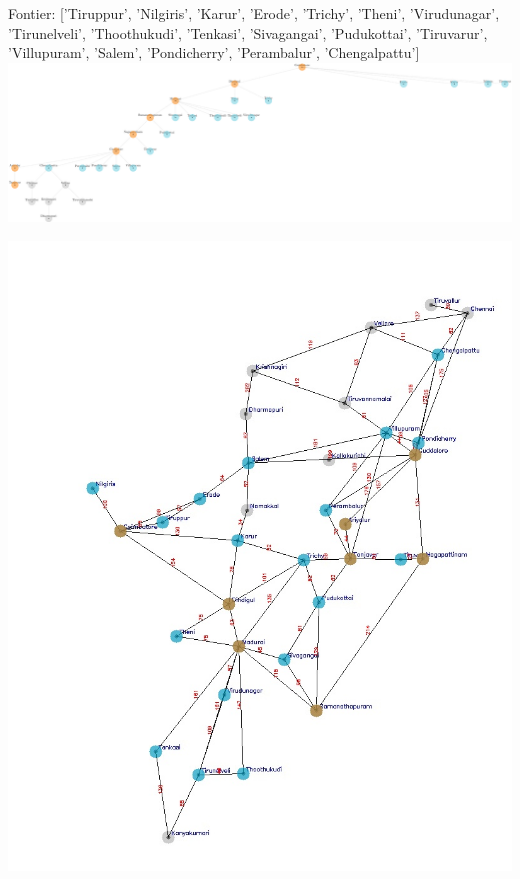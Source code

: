 \documentclass[xcolor=table]{beamer}
\begin{document}
\begin{frame}
  { \tiny Fontier: ['Tiruppur', 'Nilgiris', 'Karur', 'Erode', 'Trichy', 'Theni', 'Virudunagar', 'Tirunelveli', 'Thoothukudi', 'Tenkasi', 'Sivagangai', 'Pudukottai', 'Tiruvarur', 'Villupuram', 'Salem', 'Pondicherry', 'Perambalur', 'Chengalpattu'] }
  \includegraphics[width=1\textwidth]{../DFSNodes/10-1.png}
  \begin{center}
    \includegraphics[height=0.45\textheight]{../DFSoutput/tamilDFS8.jpg}
  \end{center}
\end{frame}
\end{document}
